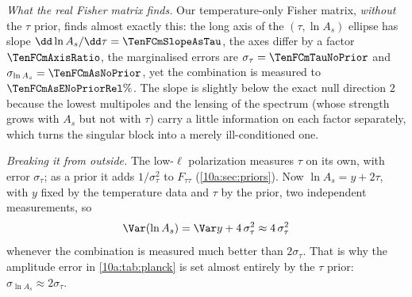 \emph{What the real Fisher matrix finds.} Our temperature-only Fisher matrix, \emph{without} the $\tau$ prior, finds
almost exactly this: the long axis of the $(\tau,\ln A_s)$ ellipse has slope $\dd\ln A_s/\dd\tau=\TenFCmSlopeAsTau$, the axes
differ by a factor $\TenFCmAxisRatio$, the marginalised errors are $\sigma_\tau=\TenFCmTauNoPrior$ and $\sigma_{\ln A_s}=\TenFCmAsNoPrior$,
yet the combination is measured to $\TenFCmAsENoPriorRel\%$. The slope is slightly below the exact null direction
$2$ because the lowest multipoles and the lensing of the spectrum (whose strength grows with $A_s$ but not with $\tau$)
carry a little information on each factor separately, which turns the singular block into a merely
ill-conditioned one.

\emph{Breaking it from outside.} The low-$\ell$ polarization measures $\tau$ on its own, with error $\sigma_\tau$; as a prior it
adds $1/\sigma_\tau^2$ to $F_{\tau\tau}$ (\cref{10a:sec:priors}). Now $\ln A_s=y+2\tau$, with $y$ fixed by the temperature data and
$\tau$ by the prior, two independent measurements, so
\[
  \Var(\ln A_s)=\Var y+4\,\sigma_\tau^2\approx4\,\sigma_\tau^2
\]
whenever the combination is measured much better than $2\sigma_\tau$. That is why the amplitude error in \cref{10a:tab:planck}
is set almost entirely by the $\tau$ prior: $\sigma_{\ln A_s}\approx2\sigma_\tau$.

